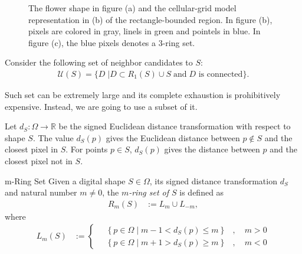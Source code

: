 \begin{figure}[]
{	}\hspace{40pt}%
	\caption{The flower shape in figure (a) and the cellular-grid model representation in (b) of the rectangle-bounded region. In figure (b), pixels are colored in gray, linels in green and pointels in blue. In figure (c), the blue pixels denotes a $3$-ring set.}
	\label{fig:cellular-grid-model}
\end{figure}


Consider the following set of neighbor candidates to $S$:
\begin{align*}
\mathcal{U}(S) = \{ D \; | D \subset R_1(S) \cup S \; \text{and} \; \text{$D$ is connected} \}.
\end{align*}


Such set can be extremely large and its complete exhaustion is prohibitively expensive.  Instead, we are going to use a subset of it.

Let $d_{S}:\Omega \rightarrow \mathbb{R}$ be the signed Euclidean distance transformation with respect to shape $S$. The value $d_S(p)$ gives the Euclidean distance between $p \notin S$ and the closest pixel in $S$. For points $p \in S$, $d_S(p)$ gives the distance between $p$ and the closest pixel not in $S$.


\begin{definition}{m-Ring Set}
Given a digital shape $S\in\Omega$, its signed distance transformation $d_S$ and natural number $m \neq 0$, the {\em $m$-ring set of $S$} is defined as
\begin{align*}
	R_m(S) &:= L_m \cup L_{-m},
\end{align*}
where
\begin{align*}
	L_m(S) &:= \left\{ \quad \begin{array}{cc}
		\left\{ p \in \Omega \; | \; m-1 < d_S(p) \leq m \right\} & , \quad m>0\\
		\left\{ p \in \Omega \; | \; m+1 > d_S(p) \geq m \right\} & , \quad m<0
		\end{array} \right.
\end{align*}
\end{definition}


